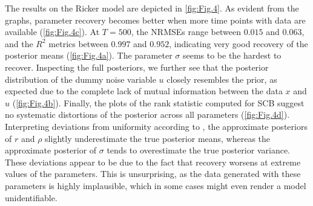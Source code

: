 \documentclass[9pt,twoside,lineno]{pnas-new}
\begin{document}
The results on the Ricker model are depicted in \autoref{fig:Fig.4}. As evident from the graphs, parameter recovery becomes better when more time points with data are available (\autoref{fig:Fig.4c}). At $T=500$, the NRMSEs range between $0.015$ and $0.063$, and the $R^{2}$ metrics between $0.997$ and $0.952$, indicating very good recovery of the posterior means (\autoref{fig:Fig.4a}). The parameter $\sigma$ seems to be the hardest to recover. Inspecting the full posteriors, we further see that the posterior distribution of the dummy noise variable $u$ closely resembles the prior, as expected due to the complete lack of mutual information between the data $x$ and $u$ (\autoref{fig:Fig.4b}). Finally, the plots of the rank statistic computed for SCB suggest no systematic distortions of the posterior across all parameters (\autoref{fig:Fig.4d}). Interpreting deviations from uniformity according to \cite{talts2018validating}, the approximate posteriors of $r$ and $\rho$ slightly underestimate the true posterior means, whereas the approximate posterior of $\sigma$ tends to overestimate the true posterior variance. These deviations appear to be due to the fact that recovery worsens at extreme values of the parameters. This is unsurprising, as the data generated with these parameters is highly implausible, which in some cases might even render a model unidentifiable.
\end{document}

